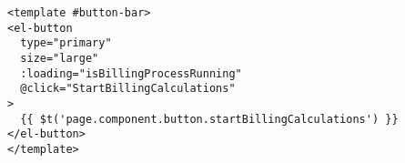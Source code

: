 \begin{minipage}{0.95\linewidth}
  \begin{lstlisting}[caption={Implementation of a button which starts the billing process only when pressed.},label={manualsynchondemandcode}]
<template #button-bar>
<el-button
  type="primary"
  size="large"
  :loading="isBillingProcessRunning"
  @click="StartBillingCalculations"
>
  {{ $t('page.component.button.startBillingCalculations') }}
</el-button>
</template>
\end{lstlisting}
\end{minipage}